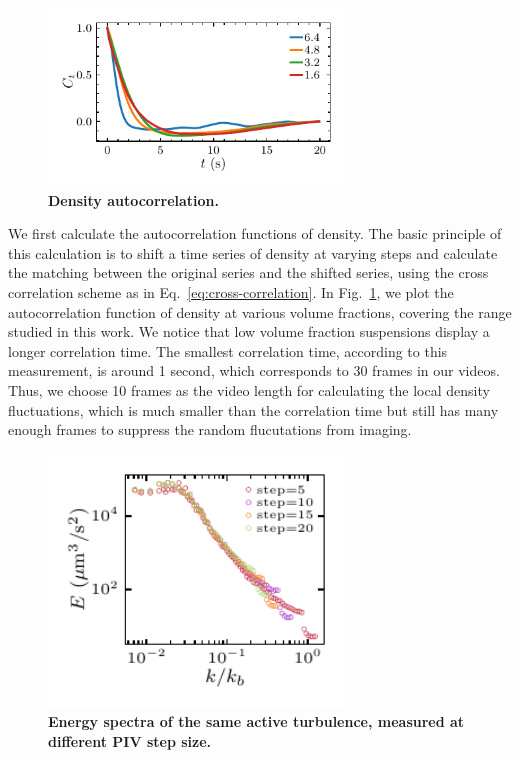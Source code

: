 \documentclass[preprint,aps,prl,amsmath,amssymb,longbibliography]{revtex4-2}
\begin{document}
\begin{figure}[!]
\begin{center}
\includegraphics[width=0.7\textwidth]{figures/density-autocorrelation/v1.pdf}
\caption[Density autocorrelation]
{
\textbf{Density autocorrelation.}
}
\label{fig:density-autocorrelation}
\end{center}
\end{figure}

We first calculate the autocorrelation functions of density. The basic principle of this calculation is to shift a time series of density at varying steps and calculate the matching between the original series and the shifted series, using the cross correlation scheme as in Eq.~\ref{eq:cross-correlation}. In Fig.~\ref{fig:density-autocorrelation}, we plot the autocorrelation function of density at various volume fractions, covering the range studied in this work. We notice that low volume fraction suspensions display a longer correlation time. The smallest correlation time, according to this measurement, is around 1 second, which corresponds to 30 frames in our videos. Thus, we choose 10 frames as the video length for calculating the local density fluctuations, which is much smaller than the correlation time but still has many enough frames to suppress the random flucutations from imaging.



\begin{figure}[!]
\begin{center}
\includegraphics[width=0.7\textwidth]{Figures/kinks-in-energy-spectra/v1.pdf}
\caption[Density autocorrelation]
{
\textbf{Energy spectra of the same active turbulence, measured at different PIV step size.}
}
\label{fig:kink}
\end{center}
\end{figure}
\end{document}

